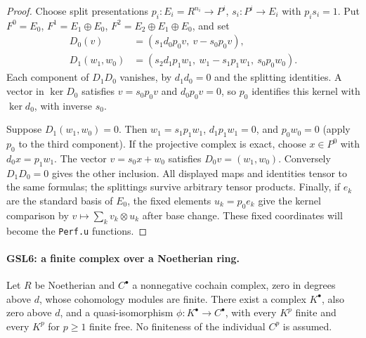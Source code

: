 \begin{proof}
Choose split presentations
$p_i:E_i=R^{n_i}\to P^i$, $s_i:P^i\to E_i$ with $p_is_i=1$.
Put $F^0=E_0$, $F^1=E_1\oplus E_0$,
$F^2=E_2\oplus E_1\oplus E_0$, and set
\begin{align*}
 D_0(v)&=(s_1d_0p_0v,\ v-s_0p_0v),\\
 D_1(w_1,w_0)&=(s_2d_1p_1w_1,\ w_1-s_1p_1w_1,\ s_0p_0w_0).
\end{align*}
Each component of $D_1D_0$ vanishes, by $d_1d_0=0$ and the
splitting identities.  A vector in $\ker D_0$ satisfies
$v=s_0p_0v$ and $d_0p_0v=0$, so $p_0$ identifies this kernel with
$\ker d_0$, with inverse $s_0$.

Suppose $D_1(w_1,w_0)=0$.  Then $w_1=s_1p_1w_1$,
$d_1p_1w_1=0$, and $p_0w_0=0$ (apply $p_0$ to the third
component).  If the projective complex is exact, choose $x\in P^0$
with $d_0x=p_1w_1$.  The vector $v=s_0x+w_0$ satisfies
$D_0v=(w_1,w_0)$.  Conversely $D_1D_0=0$ gives the other inclusion.
All displayed maps and identities tensor to the same formulas; the
splittings survive arbitrary tensor products.  Finally, if $e_k$ are
the standard basis of $E_0$, the fixed elements $u_k=p_0e_k$
give the kernel comparison by
$v\mapsto\sum_kv_k\otimes u_k$ after base change.  These fixed
coordinates will become the \texttt{Perf.u} functions.
\end{proof}

\paragraph{GSL6: a finite complex over a Noetherian ring.}
\label{claim:GSL6}
Let $R$ be Noetherian and $C^\bullet$ a nonnegative cochain complex,
zero in degrees above $d$, whose cohomology modules are finite.
There exist a complex $K^\bullet$, also zero above $d$, and a
quasi-isomorphism $\phi:K^\bullet\to C^\bullet$, with every $K^p$
finite and every $K^p$ for $p\ge1$ finite free.  No finiteness of the
individual $C^p$ is assumed.

